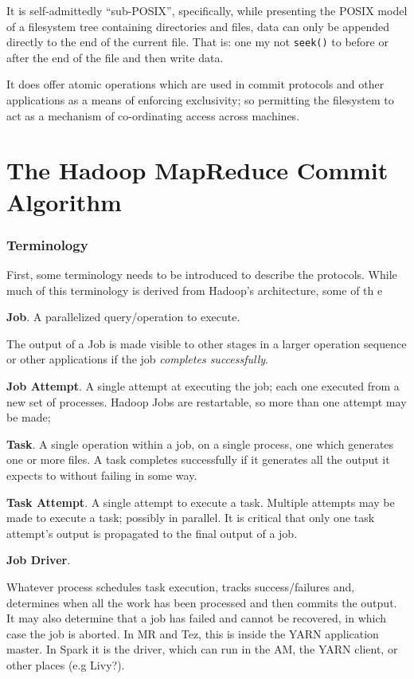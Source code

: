 \documentclass[conference]{IEEEtran}
\begin{document}
It is self-admittedly ``sub-POSIX'', specifically, while presenting the POSIX
model of a filesystem tree containing directories and files, data can only be
appended directly to the end of the current file.
That is: one my not \texttt{seek()} to before or after the end of the file and
then write data.

It does offer atomic operations which are used in commit protocols and other
applications as a means of enforcing exclusivity;
so permitting the filesystem to act as a mechanism of co-ordinating access across machines.


\section{The Hadoop MapReduce Commit Algorithm}
\label{sec:commit}


\subsubsection{Terminology}

First, some terminology needs to be introduced to describe
the protocols.
While much of this terminology is derived from Hadoop's architecture,
some of th e


\textbf{Job}.
A parallelized query/operation to execute.

The output of a Job is made visible to other stages in a larger operation
sequence or other applications if the job \emph{completes successfully}.

\textbf{Job Attempt}.
A single attempt at executing the job;
each one executed from a new set of processes.
Hadoop Jobs are restartable, so more than one attempt may be made;

\textbf{Task}.
A single operation within a job, on a single process, one which generates
one or more files.
A task completes successfully if it generates all the output it expects to without
failing in some way.

\textbf{Task Attempt}.
A single attempt to execute a task.
Multiple attempts may be made to execute a task;
possibly in parallel.
It is critical that only one task attempt's output is propagated
to the final output of a job.


\textbf{Job Driver}.

Whatever process schedules
task execution, tracks success/failures and, determines when all the work has been
processed and then commits the output.
It may also determine that a job
has failed and cannot be recovered, in which case the job is aborted.
In MR and Tez, this is inside the YARN application master.
In Spark it is the driver, which can run in the AM, the YARN client, or other
places (e.g Livy?).
\end{document}
